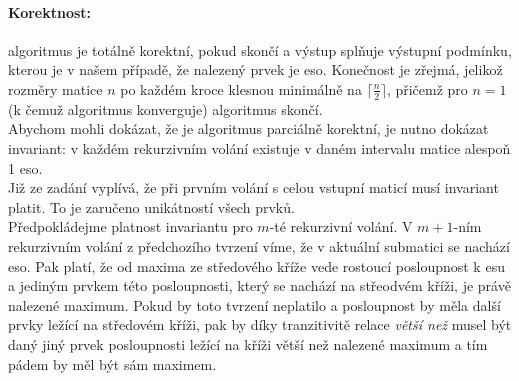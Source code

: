 \documentclass[12pt]{iv003}
\begin{document}
\paragraph{Korektnost:} algoritmus je totálně korektní, pokud skončí a výstup splňuje výstupní podmínku, kterou je v našem případě, že nalezený prvek je eso. Konečnost je zřejmá, jelikož rozměry matice $n$ po každém kroce klesnou minimálně na $\lceil \frac{n}{2} \rceil$, přičemž pro $n = 1$ (k čemuž algoritmus konverguje) algoritmus skončí.\\
Abychom mohli dokázat, že je algoritmus parciálně korektní, je nutno dokázat invariant: v každém rekurzivním volání existuje v daném intervalu matice alespoň 1 eso.\\
Již ze zadání vyplívá, že při prvním volání s celou vstupní maticí musí invariant platit. To je zaručeno unikátností všech prvků.\\
Předpokládejme platnost invariantu pro $m$-té rekurzivní volání. 
V $m+1$-ním rekurzivním volání z předchozího tvrzení víme, že v aktuální submatici se nachází eso. %
Pak platí, že od maxima ze středového kříže vede rostoucí posloupnost k esu a jediným prvkem této posloupnosti, který se nachází na střeodvém kříži, je právě nalezené maximum. Pokud by toto tvrzení neplatilo a posloupnost by měla další prvky ležící na středovém kříži, pak by díky tranzitivitě relace \textit{větší než} musel být daný jiný prvek posloupnosti ležící na kříži větší než nalezené maximum a tím pádem by měl být sám maximem.
\end{document}
